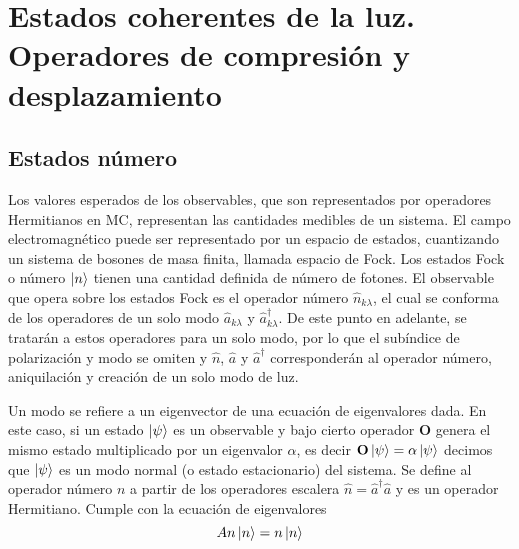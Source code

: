 \chapter{Estados coherentes de la luz. Operadores de compresión y desplazamiento}

\section{Estados número}


Los valores esperados de los observables, que son representados por operadores Hermitianos en MC, representan las cantidades medibles de un sistema. El campo electromagnético puede ser representado por un espacio de estados, cuantizando un sistema de bosones de masa finita, llamada espacio de Fock. Los estados Fock o número $\ket{n}$ tienen una cantidad definida de número de fotones. El observable que opera sobre los estados Fock es el operador número $\hat{n}_{k\lambda}$, el cual se conforma de los operadores de un solo modo $\hat{a}_{k\lambda}$ y $\hat{a}^{\dagger}_{k\lambda}$. De este punto en adelante, se tratarán a estos operadores para un solo modo, por lo que el subíndice de polarización y modo se omiten y $\hat{n}$, $\hat{a}$ y $\hat{a}^{\dagger}$ corresponderán al operador número, aniquilación y creación de un solo modo de luz.


Un modo se refiere a un eigenvector de una ecuación de eigenvalores dada. En este caso, si un estado $\ket{\psi}$ es un observable y bajo cierto operador $\mathbf{O}$ genera el mismo estado multiplicado por un eigenvalor $\alpha$, es decir $\mathbf{O}\ket{\psi} = \alpha \ket{\psi}$ decimos que $\ket{\psi}$ es un modo normal (o estado estacionario) del sistema.
Se define al operador número $n$ a partir de los operadores escalera $\hat{n} = \hat{a}^{\dagger}\hat{a}$ y es un operador Hermitiano. Cumple con la ecuación de eigenvalores %
\begin{equation*}
  A{n}\ket{n} = n \ket{n}
\end{equation*}

